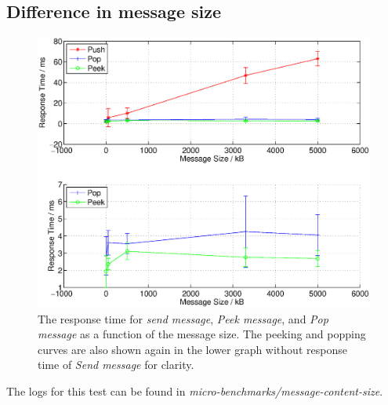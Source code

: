 \documentclass{article}
\begin{document}
        \subsection{Difference in message size}
            \begin{figure}[H]
                    \centerline{\includegraphics[scale=0.60]{responsetime_msgsize}}
                    \caption{The response time for \textit{send message}, \textit{Peek message}, and \textit{Pop message} as a function of the message size. The peeking and popping curves are also shown again in the lower graph without response time of \textit{Send message} for clarity.}
                    \label{fig:responsetime_msgsize}
                \end{figure}

        The logs for this test can be found in \textit{micro-benchmarks/message-content-size}.
\end{document}
